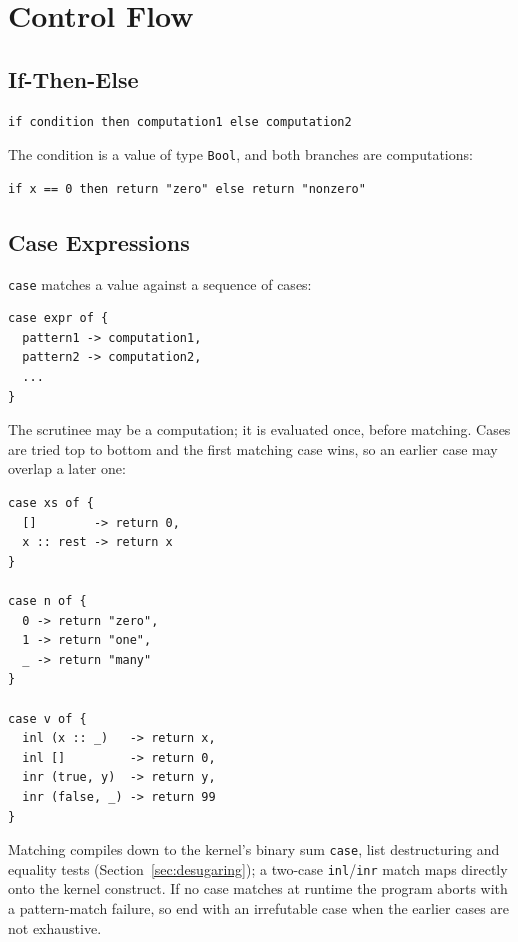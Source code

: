\documentclass[11pt,a4paper]{article}
\newcommand{\cba}[1]{\lstinline[style=cbainline]{#1}}
\begin{document}
\section{Control Flow}
\label{sec:control}

\subsection{If-Then-Else}

\begin{lstlisting}
if condition then computation1 else computation2
\end{lstlisting}

The condition is a value of type \texttt{Bool}, and both branches are
computations:

\begin{lstlisting}
if x == 0 then return "zero" else return "nonzero"
\end{lstlisting}

\subsection{Case Expressions}

\cba{case} matches a value against a sequence of cases:

\begin{lstlisting}
case expr of {
  pattern1 -> computation1,
  pattern2 -> computation2,
  ...
}
\end{lstlisting}

The scrutinee may be a computation; it is evaluated once, before matching.
Cases are tried top to bottom and the first matching case wins, so an
earlier case may overlap a later one:

\begin{lstlisting}
case xs of {
  []        -> return 0,
  x :: rest -> return x
}

case n of {
  0 -> return "zero",
  1 -> return "one",
  _ -> return "many"
}

case v of {
  inl (x :: _)   -> return x,
  inl []         -> return 0,
  inr (true, y)  -> return y,
  inr (false, _) -> return 99
}
\end{lstlisting}

Matching compiles down to the kernel's binary sum \cba{case}, list
destructuring and equality tests (Section~\ref{sec:desugaring}); a two-case
\cba{inl}/\cba{inr} match maps directly onto the kernel construct.  If no case matches at runtime the
program aborts with a pattern-match failure, so end with an irrefutable
case when the earlier cases are not exhaustive.
\end{document}
